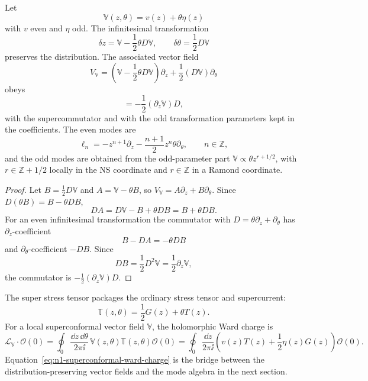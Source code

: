 \begin{lemma}
\label{lem:n1-infinitesimal-superconformal-vector-fields}
Let
\[
  \mathbb V(z,\theta)=v(z)+\theta\eta(z)
\]
with \(v\) even and \(\eta\) odd.  The infinitesimal transformation
\begin{equation}
  \delta z
  =
  \mathbb V-\frac12\theta D\mathbb V,
  \qquad
  \delta\theta
  =
  \frac12D\mathbb V
  \label{eq:n1-infinitesimal-superconformal-law}
\end{equation}
preserves the distribution.  The associated vector field
\[
  V_{\mathbb V}
  =
  \left(\mathbb V-\frac12\theta D\mathbb V\right)\partial_z
  +\frac12(D\mathbb V)\partial_\theta
\]
obeys
\begin{equation}
  [V_{\mathbb V},D]
  =
  -\frac12(\partial_z\mathbb V)D,
  \label{eq:n1-contact-vector-preserves-D}
\end{equation}
with the supercommutator and with the odd transformation parameters kept in
the coefficients.  The even modes are
\[
  \ell_n
  =
  -z^{n+1}\partial_z
  -\frac{n+1}{2}z^n\theta\partial_\theta,
  \qquad n\in\mathbb Z,
\]
and the odd modes are obtained from the odd-parameter part
\(\mathbb V\propto \theta z^{r+1/2}\), with
\(r\in\mathbb Z+1/2\) locally in the NS coordinate and \(r\in\mathbb Z\) in a
Ramond coordinate.
\end{lemma}

\begin{proof}
Let \(B=\frac12D\mathbb V\) and \(A=\mathbb V-\theta B\), so
\(V_{\mathbb V}=A\partial_z+B\partial_\theta\).  Since
\(D(\theta B)=B-\theta DB\),
\[
  DA=D\mathbb V-B+\theta DB=B+\theta DB.
\]
For an even infinitesimal transformation the commutator with
\(D=\theta\partial_z+\partial_\theta\) has \(\partial_z\)-coefficient
\[
  B-DA=-\theta DB
\]
and \(\partial_\theta\)-coefficient \(-DB\).  Since
\[
  DB=\frac12D^2\mathbb V=\frac12\partial_z\mathbb V,
\]
the commutator is \(-\frac12(\partial_z\mathbb V)D\).
\end{proof}

The super stress tensor packages the ordinary stress tensor and supercurrent:
\begin{equation}
  \mathbb T(z,\theta)=\frac12G(z)+\theta T(z).
  \label{eq:n1-super-stress-tensor}
\end{equation}
For a local superconformal vector field \(\mathbb V\), the holomorphic Ward
charge is
\begin{equation}
  \mathcal L_{\mathbb V}\cdot\mathcal O(0)
  =
  \oint_0\frac{\dd z\,\dd\theta}{2\pi\ii}\,
  \mathbb V(z,\theta)\mathbb T(z,\theta)\mathcal O(0)
  =
  \oint_0\frac{\dd z}{2\pi\ii}
  \left(v(z)T(z)+\frac12\eta(z)G(z)\right)\mathcal O(0).
  \label{eq:n1-superconformal-ward-charge}
\end{equation}
Equation~\eqref{eq:n1-superconformal-ward-charge} is the bridge between the
distribution-preserving vector fields and the mode algebra in the next
section.


